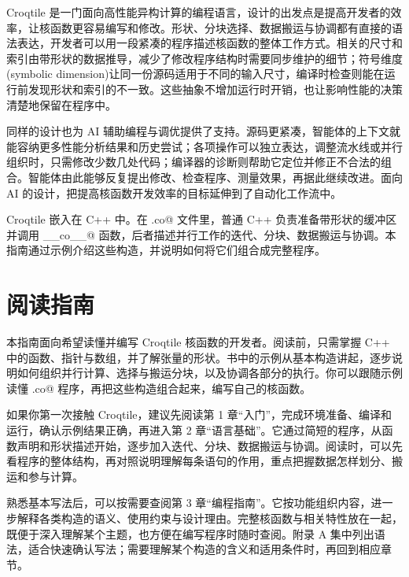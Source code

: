 Croqtile 是一门面向高性能异构计算的编程语言，设计的出发点是提高开发者的效率，让核函数更容易编写和修改。形状、分块选择、数据搬运与协调都有直接的语法表达，开发者可以用一段紧凑的程序描述核函数的整体工作方式。相关的尺寸和索引由带形状的数据推导，减少了修改程序结构时需要同步维护的细节；符号维度(symbolic dimension)让同一份源码适用于不同的输入尺寸，编译时检查则能在运行前发现形状和索引的不一致。这些抽象不增加运行时开销，也让影响性能的决策清楚地保留在程序中。

同样的设计也为 AI 辅助编程与调优提供了支持。源码更紧凑，智能体的上下文就能容纳更多性能分析结果和历史尝试；各项操作可以独立表达，调整流水线或并行组织时，只需修改少数几处代码；编译器的诊断则帮助它定位并修正不合法的组合。智能体由此能够反复提出修改、检查程序、测量效果，再据此继续改进。面向 AI 的设计，把提高核函数开发效率的目标延伸到了自动化工作流中。

Croqtile 嵌入在 C++ 中。在 \co@.co@ 文件里，普通 C++ 负责准备带形状的缓冲区并调用 \co@__co__@ 函数，后者描述并行工作的迭代、分块、数据搬运与协调。本指南通过示例介绍这些构造，并说明如何将它们组合成完整程序。

\chapter*{阅读指南}


本指南面向希望读懂并编写 Croqtile 核函数的开发者。阅读前，只需掌握 C++ 中的函数、指针与数组，并了解张量的形状。书中的示例从基本构造讲起，逐步说明如何组织并行计算、选择与搬运分块，以及协调各部分的执行。你可以跟随示例读懂 \co@.co@ 程序，再把这些构造组合起来，编写自己的核函数。

如果你第一次接触 Croqtile，建议先阅读第 1 章“入门”，完成环境准备、编译和运行，确认示例结果正确，再进入第 2 章“语言基础”。它通过简短的程序，从函数声明和形状描述开始，逐步加入迭代、分块、数据搬运与协调。阅读时，可以先看程序的整体结构，再对照说明理解每条语句的作用，重点把握数据怎样划分、搬运和参与计算。

熟悉基本写法后，可以按需要查阅第 3 章“编程指南”。它按功能组织内容，进一步解释各类构造的语义、使用约束与设计理由。完整核函数与相关特性放在一起，既便于深入理解某个主题，也方便在编写程序时随时查阅。附录 A 集中列出语法，适合快速确认写法；需要理解某个构造的含义和适用条件时，再回到相应章节。
